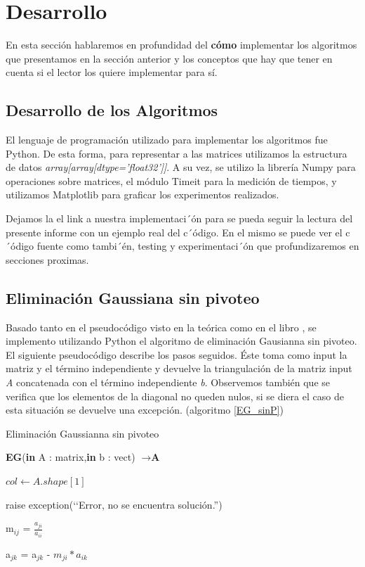\section{Desarrollo}

En esta sección hablaremos en profundidad del \textbf{cómo} implementar los algoritmos que presentamos en la sección anterior y los conceptos que hay que tener en cuenta si el lector los quiere implementar para sí.

\subsection{Desarrollo de los Algoritmos}

El lenguaje de programación utilizado para implementar los algoritmos fue Python. De esta forma, para representar a las matrices utilizamos la estructura de datos \textit{array[array[dtype='float32']]}. 
A su vez, se utilizo la librería Numpy para operaciones sobre matrices, el módulo Timeit para la medición de tiempos, y utilizamos Matplotlib para graficar los experimentos realizados.

Dejamos la el link a nuestra implementaci´ón \cite{Colab} para se pueda seguir la lectura del presente informe con un ejemplo real del c´ódigo. En el mismo se puede ver el c´ódigo fuente como tambi´én, testing y experimentaci´ón que profundizaremos en secciones proximas.

\subsection{Eliminación Gaussiana sin pivoteo}

Basado tanto en el pseudocódigo visto en la teórica \cite{teoEG} como en el libro \cite{Recipes07}, se implemento utilizando Python el algoritmo de eliminación Gausianna sin pivoteo. 
El siguiente pseudocódigo describe los pasos seguidos. Éste toma como input la matriz y el término independiente y devuelve la triangulación de la matriz input \textit{A} concatenada con el término independiente \textit{b}. Observemos también que se verifica que los elementos de la diagonal no queden nulos, si se diera el caso de esta situación se devuelve una excepción. (algoritmo \ref{EG_sinP})


\begin{algorithm}
\caption{Eliminación Gaussianna sin pivoteo}\label{EG_sinP}
\begin{algorithmic}
\State \textbf{EG}(\textbf{in} A : matrix,\textbf{in} b : vect) $\to \textbf{A}$
 
 \State $col \gets A.shape[1]$
 
        \State  raise exception(‘‘Error, no se encuentra solución.'') 
    \EndIf


    \State m$_{ij}$ = $\frac{a_{ji}}{a_{ii}}$
    
        \State a$_{jk}$ = a$_{jk}$ - $m_{ji}*{a_{ik}}$
    \EndFor

\EndFor
\EndFor
\end{algorithmic}
\end{algorithm}

